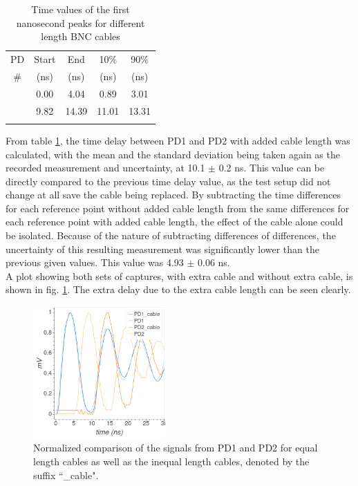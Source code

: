 \documentclass[aps,prl,reprint]{revtex4-2}
\begin{document}
\begin{table}[h]
\renewcommand{\arraystretch}{1.35}
\setlength{\tabcolsep}{10pt}
\caption{\label{TD_Cb} Time values of the first nanosecond peaks for different length 
	BNC cables}
\begin{tabular}{|c|c|c|c|c|}
\toprule
PD & Start & End & 10\% & 90\% \\
\# & (ns)& (ns)& (ns)& (ns)\\
\colrule
1 &   0.00 &   4.04 &   0.89 &   3.01 \\
\colrule
2 &   9.82 &  14.39 &  11.01 &  13.31 \\
\hline
\botrule
\end{tabular}
\end{table}

From table \ref{TD_Cb}, the time delay between PD1 and PD2 with added cable length
was calculated, with the mean and the standard deviation being taken again as the recorded 
measurement and uncertainty, at 10.1 $\pm$ 0.2 ns. This value can be directly compared
to the previous time delay value, as the test setup did not change at all save the cable being 
replaced. By subtracting the time differences for each reference point without added
cable length from the same differences for each reference point with added cable length,
the effect of the cable alone could be isolated. Because of the nature of subtracting
differences of differences, the uncertainty of this resulting measurement was significantly
lower than the previous given values. This value was 4.93 $\pm$ 0.06 ns. \\


A plot showing both sets of captures, with extra
cable and without extra cable, is shown in fig. \ref{comparison}. The extra delay due to
the extra cable length can be seen clearly. \\

\begin{figure}[h]
\includegraphics[width=0.45\textwidth]{./l4_A.png}
\caption{\label{comparison} Normalized comparison of the signals from PD1 and PD2 for equal
length cables as well as the inequal length cables, denoted by the suffix ``\_cable".}
\end{figure}
\end{document}
